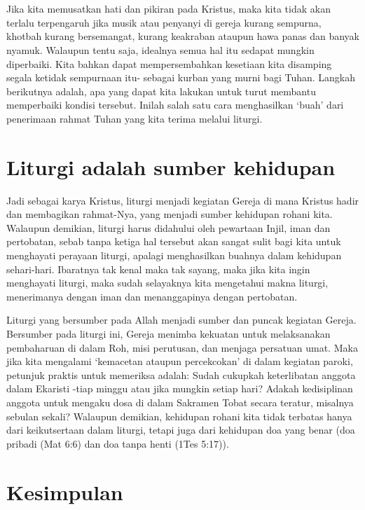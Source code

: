 \begin{enumerate}[label=\textbf{Langkah \arabic*}]
\\{~}\\
Jika kita memusatkan hati dan pikiran pada Kristus, maka kita tidak akan terlalu terpengaruh jika musik atau penyanyi di gereja kurang sempurna, khotbah kurang bersemangat, kurang keakraban ataupun hawa panas dan banyak nyamuk. Walaupun tentu saja, idealnya semua hal itu sedapat mungkin diperbaiki. Kita bahkan dapat mempersembahkan kesetiaan kita disamping segala ketidak sempurnaan itu- sebagai kurban yang murni bagi Tuhan. Langkah berikutnya adalah, apa yang dapat kita lakukan untuk turut membantu memperbaiki kondisi tersebut. Inilah salah satu cara menghasilkan ‘buah’ dari penerimaan rahmat Tuhan yang kita terima melalui liturgi.
\end{enumerate}

\section*{Liturgi adalah sumber kehidupan}

Jadi sebagai karya Kristus, liturgi menjadi kegiatan Gereja di mana Kristus hadir dan membagikan rahmat-Nya, yang menjadi sumber kehidupan rohani kita. Walaupun demikian, liturgi harus didahului oleh pewartaan Injil, iman dan pertobatan, sebab tanpa ketiga hal tersebut akan sangat sulit bagi kita untuk menghayati perayaan liturgi, apalagi menghasilkan buahnya dalam kehidupan sehari-hari. Ibaratnya tak kenal maka tak sayang, maka jika kita ingin menghayati liturgi, maka sudah selayaknya kita mengetahui makna liturgi, menerimanya dengan iman dan menanggapinya dengan pertobatan.

Liturgi yang bersumber pada Allah menjadi sumber dan puncak kegiatan Gereja. Bersumber pada liturgi ini, Gereja menimba kekuatan untuk melaksanakan pembaharuan di dalam Roh, misi perutusan, dan menjaga persatuan umat. Maka jika kita mengalami ‘kemacetan ataupun percekcokan’ di dalam kegiatan paroki, petunjuk praktis untuk memeriksa adalah: Sudah cukupkah keterlibatan anggota dalam Ekaristi -tiap minggu atau jika mungkin setiap hari? Adakah kedisiplinan anggota untuk mengaku dosa di dalam Sakramen Tobat secara teratur, misalnya sebulan sekali? Walaupun demikian, kehidupan rohani kita tidak terbatas hanya dari keikutsertaan dalam liturgi, tetapi juga dari kehidupan doa yang benar (doa pribadi (Mat 6:6) dan doa tanpa henti (1Tes 5:17)).

\section*{Kesimpulan}


